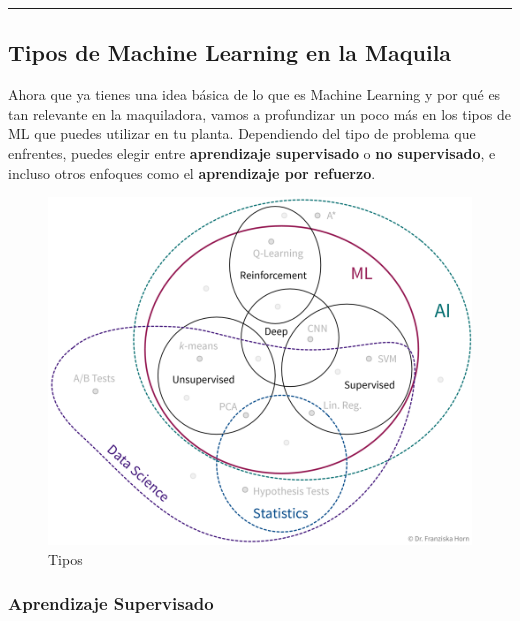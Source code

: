 \documentclass[
  10pt,
  letterpaper,
]{book}
\begin{document}
\begin{center}\rule{0.5\linewidth}{0.5pt}\end{center}

\subsection{\texorpdfstring{\textbf{Tipos de Machine Learning en la
Maquila}}{Tipos de Machine Learning en la Maquila}}\label{tipos-de-machine-learning-en-la-maquila}

Ahora que ya tienes una idea básica de lo que es Machine Learning y por
qué es tan relevante en la maquiladora, vamos a profundizar un poco más
en los tipos de ML que puedes utilizar en tu planta. Dependiendo del
tipo de problema que enfrentes, puedes elegir entre \textbf{aprendizaje
supervisado} o \textbf{no supervisado}, e incluso otros enfoques como el
\textbf{aprendizaje por refuerzo}.

\begin{figure}[H]

{\centering \includegraphics{Img/imagen_21.jpg}

}

\caption{Tipos}

\end{figure}%

\subsubsection{\texorpdfstring{\textbf{Aprendizaje
Supervisado}}{Aprendizaje Supervisado}}\label{aprendizaje-supervisado-1}
\end{document}
